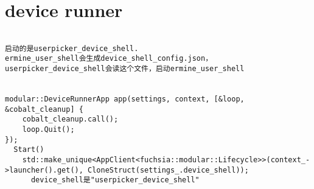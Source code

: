 \section{device runner}

\begin{verbatim}

启动的是userpicker_device_shell.
ermine_user_shell会生成device_shell_config.json，
userpicker_device_shell会读这个文件，启动ermine_user_shell


modular::DeviceRunnerApp app(settings, context, [&loop, &cobalt_cleanup] {
    cobalt_cleanup.call();
    loop.Quit();
});
  Start()
    std::make_unique<AppClient<fuchsia::modular::Lifecycle>>(context_->launcher().get(), CloneStruct(settings_.device_shell));
      device_shell是"userpicker_device_shell"




\end{verbatim}